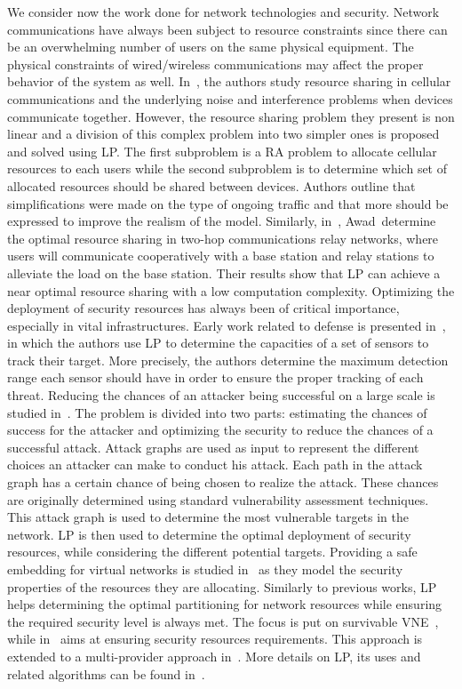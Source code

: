 We consider now the work done for network technologies and security. 
Network communications have always been subject to resource constraints since there can be an overwhelming number of users on the same physical equipment. 
The physical constraints of wired/wireless communications may affect the proper behavior of the system as well.
In~\cite{wirelessvirt-moubayed2015}, the authors study resource sharing in cellular communications and the underlying noise and interference problems when devices communicate together.
However, the resource sharing problem they present is non linear and a division of this complex problem into two simpler ones is proposed and solved using LP.
The first subproblem is a RA problem to allocate cellular resources to each users while the second subproblem is to determine which set of allocated resources should be shared between devices.
Authors outline that simplifications were made on the type of ongoing traffic and that more should be expressed to improve the realism of the model.
Similarly, in~\cite{ofdma-awad2008}, Awad~\etal determine the optimal resource sharing in two-hop communications relay networks, where users will communicate cooperatively with a base station and relay stations to alleviate the load on the base station. Their results show that LP can achieve a near optimal resource sharing with a low computation complexity.
Optimizing the deployment of security resources has always been of critical importance, especially in vital infrastructures.
Early work related to defense is presented in~\cite{monitoring-nash1977}, in which the authors use LP to determine the capacities of a set of sensors to track their target. More precisely, the authors determine the maximum detection range each sensor should have in order to ensure the proper tracking of each threat. 
Reducing the chances of an attacker being successful on a large scale is studied in~\cite{Almohri2016}. The problem is divided into two parts: estimating the chances of success for the attacker and optimizing the security to reduce the chances of a successful attack.
Attack graphs are used as input to represent the different choices an attacker can make to conduct his attack. Each path in the attack graph has a certain chance of being chosen to realize the attack. These chances are originally determined using standard vulnerability assessment techniques.
This attack graph is used to determine the most vulnerable targets in the network.
LP is then used to determine the optimal deployment of security resources, while considering the different potential targets.
Providing a safe embedding for virtual networks is studied in~\cite{Chowdhury2016d,safevne-bays2012,Boutigny2018} as they model the security properties of the resources they are allocating. Similarly to previous works, LP helps determining the optimal partitioning for network resources while ensuring the required security level is always met.
The focus is put on survivable VNE~\cite{Chowdhury2016d}, while in~\cite{safevne-bays2012} aims at ensuring security resources requirements. This approach is extended to a multi-provider approach in~\cite{Boutigny2018}.
More details on LP, its uses and related algorithms can be found in~\cite{book-LP}.
